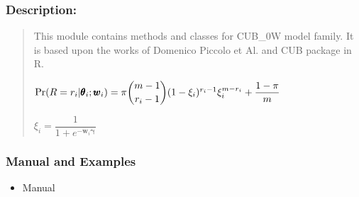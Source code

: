 \documentclass[letterpaper,10pt,english]{sphinxmanual}
\begin{document}
\subsubsection{Description:}
\label{\detokenize{cubmods:id75}}\begin{quote}

\sphinxAtStartPar
This module contains methods and classes
for CUB\_0W model family.
It is based upon the works of Domenico
Piccolo et Al. and CUB package in R.

\sphinxAtStartPar
\(\Pr(R=r_i|\pmb{\theta}_i ; \pmb w_i) = \pi \dbinom{m-1}{r_i-1}(1-\xi_i)^{r_i-1}\xi_i^{m-r_i}+\dfrac{1-\pi}{m}\)

\sphinxAtStartPar
\(\xi_i = \dfrac{1}{1+e^{-\pmb w_i \pmb\gamma}}\)
\end{quote}


\subsubsection{Manual and Examples}
\label{\detokenize{cubmods:id76}}\begin{itemize}
\item {} 
\sphinxAtStartPar
Manual 

\end{itemize}
\end{document}
